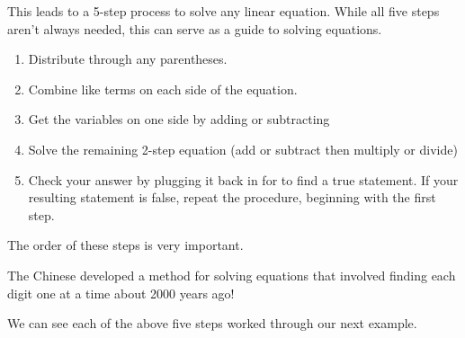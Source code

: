  This leads to a 5-step process to solve any linear equation. While all five
steps aren't always needed, this can serve as a guide to solving equations.
\begin{enumerate}
  \item Distribute through any parentheses.
  
  \item Combine like terms on each side of the equation.
  
  \item Get the variables on one side by adding or subtracting
  
  \item Solve the remaining 2-step equation (add or subtract then multiply or
  divide)
  
  \item Check your answer by plugging it back in for {} to find a true
  statement.  If your resulting statement is false, repeat the procedure, beginning with the first step.
\end{enumerate}
 The order of these steps is very important.\pp

 {} The Chinese developed a method for solving
equations that involved finding each digit one at a time about 2000 years ago!\pp

 We can see each of the above five steps worked through our next example.

